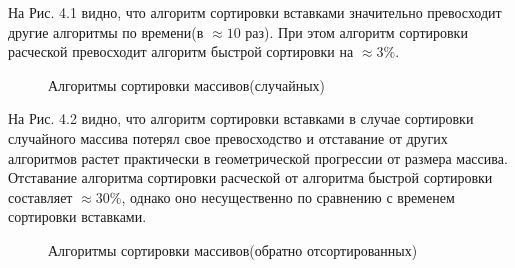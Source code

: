 \documentclass[a4paper,12pt]{report}
\begin{document}
На Рис. 4.1 видно, что алгоритм сортировки вставками значительно превосходит другие алгоритмы по времени(в $\approx 10$ раз). При этом алгоритм сортировки расческой превосходит алгоритм быстрой сортировки на $\approx 3\%$.

\begin{figure}[ht!]
\begin{center}
\caption{Алгоритмы сортировки массивов(случайных)}
\end{center}
\end{figure}

На Рис. 4.2 видно, что алгоритм сортировки вставками в случае сортировки случайного массива потерял свое превосходство и отставание от других алгоритмов растет практически в геометрической прогрессии от размера массива. Отставание алгоритма сортировки расческой от алгоритма быстрой сортировки составляет $\approx 30\%$, однако оно несущественно по сравнению с временем сортировки вставками.

\begin{figure}[ht!]
\begin{center}
\caption{Алгоритмы сортировки массивов(обратно отсортированных)}
\end{center}
\end{figure}
\end{document}

